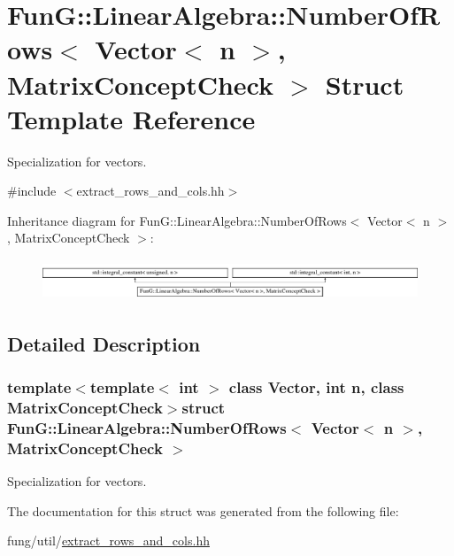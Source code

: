 \hypertarget{structFunG_1_1LinearAlgebra_1_1NumberOfRows_3_01Vector_3_01n_01_4_00_01MatrixConceptCheck_01_4}{}\section{Fun\+G\+:\+:Linear\+Algebra\+:\+:Number\+Of\+Rows$<$ Vector$<$ n $>$, Matrix\+Concept\+Check $>$ Struct Template Reference}
\label{structFunG_1_1LinearAlgebra_1_1NumberOfRows_3_01Vector_3_01n_01_4_00_01MatrixConceptCheck_01_4}


Specialization for vectors.  




{\ttfamily \#include $<$extract\+\_\+rows\+\_\+and\+\_\+cols.\+hh$>$}

Inheritance diagram for Fun\+G\+:\+:Linear\+Algebra\+:\+:Number\+Of\+Rows$<$ Vector$<$ n $>$, Matrix\+Concept\+Check $>$\+:\begin{figure}[H]
\begin{center}
\leavevmode
\includegraphics[height=1.238938cm]{structFunG_1_1LinearAlgebra_1_1NumberOfRows_3_01Vector_3_01n_01_4_00_01MatrixConceptCheck_01_4}
\end{center}
\end{figure}


\subsection{Detailed Description}
\subsubsection*{template$<$template$<$ int $>$ class Vector, int n, class Matrix\+Concept\+Check$>$struct Fun\+G\+::\+Linear\+Algebra\+::\+Number\+Of\+Rows$<$ Vector$<$ n $>$, Matrix\+Concept\+Check $>$}

Specialization for vectors. 

The documentation for this struct was generated from the following file\+:\begin{DoxyCompactItemize}
\item 
fung/util/\hyperlink{extract__rows__and__cols_8hh}{extract\+\_\+rows\+\_\+and\+\_\+cols.\+hh}\end{DoxyCompactItemize}
